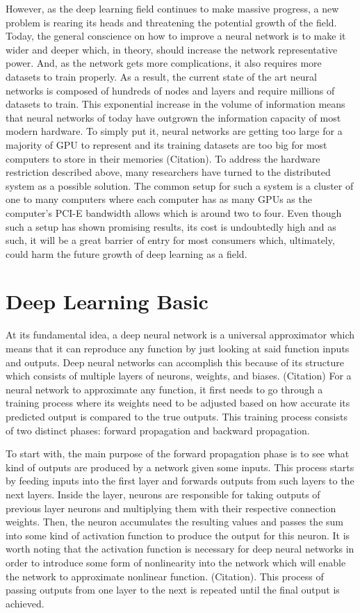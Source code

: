 \documentclass{IEEEtran}
\begin{document}
        However, as the deep learning field continues to make massive progress, a new problem is rearing its heads and threatening the potential growth of the field. Today, the general conscience on how to improve a neural network is to make it wider and deeper which, in theory, should increase the network representative power. And, as the network gets more complications, it also requires more datasets to train properly. As a result, the current state of the art neural networks is composed of hundreds of nodes and layers and require millions of datasets to train. This exponential increase in the volume of information means that neural networks of today have outgrown the information capacity of most modern hardware. To simply put it, neural networks are getting too large for a majority of GPU to represent and its training datasets are too big for most computers to store in their memories (Citation). To address the hardware restriction described above, many researchers have turned to the distributed system as a possible solution. The common setup for such a system is a cluster of one to many computers where each computer has as many GPUs as the computer's PCI-E bandwidth allows which is around two to four.  Even though such a setup has shown promising results, its cost is undoubtedly high and as such, it will be a great barrier of entry for most consumers which, ultimately, could harm the future growth of deep learning as a field. 

    \section{Deep Learning Basic}
        At its fundamental idea, a deep neural network is a universal approximator which means that it can reproduce any function by just looking at said function inputs and outputs. Deep neural networks can accomplish this because of its structure which consists of multiple layers of neurons, weights, and biases. (Citation) For a neural network to approximate any function, it first needs to go through a training process where its weights need to be adjusted based on how accurate its predicted output is compared to the true outputs. This training process consists of two distinct phases: forward propagation and backward propagation. 

        To start with, the main purpose of the forward propagation phase is to see what kind of outputs are produced by a network given some inputs. This process starts by feeding inputs into the first layer and forwards outputs from such layers to the next layers. Inside the layer, neurons are responsible for taking outputs of previous layer neurons and multiplying them with their respective connection weights. Then, the neuron accumulates the resulting values and passes the sum into some kind of activation function to produce the output for this neuron. It is worth noting that the activation function is necessary for deep neural networks in order to introduce some form of nonlinearity into the network which will enable the network to approximate nonlinear function. (Citation). This process of passing outputs from one layer to the next is repeated until the final output is achieved.
\end{document}
